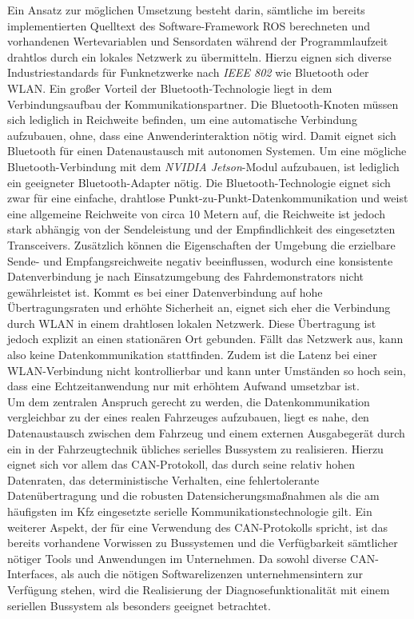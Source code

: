 Ein Ansatz zur möglichen Umsetzung besteht darin, sämtliche im bereits implementierten Quelltext des Software-Framework ROS berechneten und vorhandenen Wertevariablen und Sensordaten während der Programmlaufzeit drahtlos durch ein lokales Netzwerk zu übermitteln. Hierzu eignen sich diverse Industriestandards für Funknetzwerke nach \emph{\acs{IEEE} 802} wie Bluetooth oder WLAN. Ein großer Vorteil der Bluetooth-Technologie liegt in dem Verbindungsaufbau der Kommunikationspartner. Die Bluetooth-Knoten müssen sich lediglich in Reichweite befinden, um eine automatische Verbindung aufzubauen, ohne, dass eine Anwenderinteraktion nötig wird. Damit eignet sich Bluetooth für einen Datenaustausch mit autonomen Systemen. Um eine mögliche Bluetooth-Verbindung mit dem \emph{NVIDIA Jetson}-Modul aufzubauen, ist lediglich ein geeigneter Bluetooth-Adapter nötig. Die Bluetooth-Technologie eignet sich zwar für eine einfache, drahtlose Punkt-zu-Punkt-Datenkommunikation und weist eine allgemeine Reichweite von circa 10 Metern auf, die Reichweite ist jedoch stark abhängig von der Sendeleistung und der Empfindlichkeit des eingesetzten Transceivers. Zusätzlich können die Eigenschaften der Umgebung die erzielbare Sende- und Empfangsreichweite negativ beeinflussen, wodurch eine konsistente Datenverbindung je nach Einsatzumgebung des Fahrdemonstrators nicht gewährleistet ist.
Kommt es bei einer Datenverbindung auf hohe Übertragungsraten und erhöhte Sicherheit an, eignet sich eher die Verbindung durch WLAN in einem drahtlosen lokalen Netzwerk. Diese Übertragung ist jedoch explizit an einen stationären Ort gebunden. Fällt das Netzwerk aus, kann also keine Datenkommunikation stattfinden. Zudem ist die Latenz bei einer WLAN-Verbindung nicht kontrollierbar und kann unter Umständen so hoch sein, dass eine Echtzeitanwendung nur mit erhöhtem Aufwand umsetzbar ist. \\
Um dem zentralen Anspruch gerecht zu werden, die Datenkommunikation vergleichbar zu der eines realen Fahrzeuges aufzubauen, liegt es nahe, den Datenaustausch zwischen dem Fahrzeug und einem externen Ausgabegerät durch ein in der Fahrzeugtechnik übliches serielles Bussystem zu realisieren. Hierzu eignet sich vor allem das CAN-Protokoll, das durch seine relativ hohen Datenraten, das deterministische Verhalten, eine fehlertolerante Datenübertragung und die robusten Datensicherungsmaßnahmen als die am häufigsten im Kfz eingesetzte serielle Kommunikationstechnologie gilt. Ein weiterer Aspekt, der für eine Verwendung des CAN-Protokolls spricht, ist das bereits vorhandene Vorwissen zu Bussystemen und die Verfügbarkeit sämtlicher nötiger Tools und Anwendungen im Unternehmen. Da sowohl diverse CAN-Interfaces, als auch die nötigen Softwarelizenzen unternehmensintern zur Verfügung stehen, wird die Realisierung der Diagnosefunktionalität mit einem seriellen Bussystem als besonders geeignet betrachtet. 
